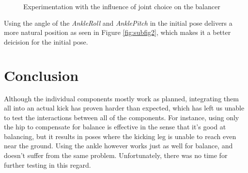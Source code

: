 \documentclass[a4paper]{article}
\begin{document}
\begin{figure}[ht]
\centering



\label{myfigure}
\caption{Experimentation with the influence of joint choice on the balancer}
\end{figure}
Using the angle of the \emph{AnkleRoll} and \emph{AnklePitch} in the initial
pose delivers a more natural position as seen in Figure \ref{fig:subfig2},
which makes it a better deicision for the initial pose. 

\section{Conclusion}
Although the individual components mostly work as planned, integrating them all
into an actual kick has proven harder than expected, which has left us unable to
test the interactions between all of the components. For instance, using only the hip to
compensate for balance is effective in the sense that it's good at balancing,
but it results in poses where the kicking leg is unable to reach even near the
ground. Using the ankle however works just as well for balance, and doesn't
suffer from the same problem. Unfortunately, there was no time for further testing
in this regard.
\end{document}
